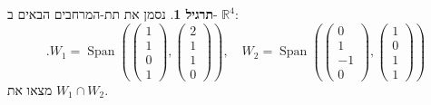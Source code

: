 \documentclass[12pt]{report}
\theoremstyle{plain}
\theoremstyle{definition}
\newtheorem{exercise}{תרגיל}[chapter]
\newcommand{\R}{\mathbb{R}}
\newcommand{\0}{\mathbf{0}}
\DeclareMathOperator{\Span}{Span}
\begin{document}
\begin{exercise}
נסמן את תת-המרחבים הבאים ב-
$\R^4$:
$$
.W_1=\Span\left(\begin{pmatrix}1\\1\\0\\1\end{pmatrix},\begin{pmatrix}2\\1\\1\\0\end{pmatrix}\right),\quad W_2=\Span\left(\begin{pmatrix}0\\1\\-1\\0\end{pmatrix},\begin{pmatrix}1\\0\\1\\1\end{pmatrix}\right)
$$
מצאו את
$W_1\cap W_2$.
\end{exercise}
\end{document}
